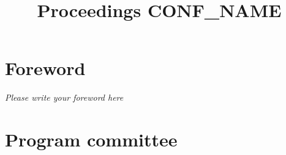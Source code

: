 \documentclass{report}
\begin{document}
\title{ \textbf{Proceedings {CONF_NAME}}}
\author{}

\maketitle

\tableofcontents

\chapter*{Foreword}
\textit{Please write your foreword here}

\chapter*{Program committee}
\begin{multicols}{2}

\end{multicols}



\printindex[authors]
\end{document}
